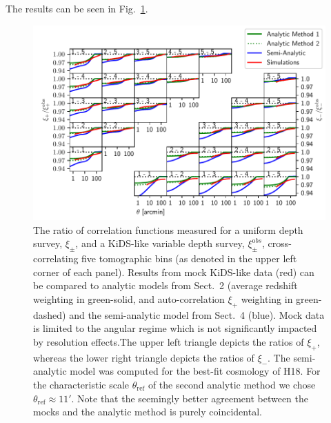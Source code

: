\documentclass{aa}
\renewcommand{\rm}{\mathrm}
\begin{document}
The results can be seen in Fig.~\ref{fig:all_xis}.
  \begin{figure}
  \centering
  \includegraphics[width=0.9\linewidth]{images/xis_all1.pdf}
  \caption{The ratio of correlation functions measured for a uniform depth survey, $\xi_\pm$, and a KiDS-like variable depth survey, $\xi_\pm^{\rm obs}$, cross-correlating five tomographic bins (as denoted in the upper left corner of each panel). Results from mock KiDS-like data (red) can be compared to analytic models from Sect.~2 (average redshift weighting in green-solid, and auto-correlation $\xi_+$ weighting in green-dashed) and the semi-analytic model from Sect.~4 (blue). Mock data is limited to the angular regime which is not significantly impacted by resolution effects.The upper left triangle depicts the ratios of $\xi_+$, whereas the lower right triangle depicts the ratios of $\xi_-$. The semi-analytic model was computed for the best-fit cosmology of H18. For the characteristic scale $\theta_{\rm{ref}}$ of the second analytic method we chose $\theta_{\rm{ref}} \approx 11'$. Note that the seemingly better agreement between the mocks and the analytic method is purely coincidental.}
  \label{fig:all_xis}
  \end{figure}
\end{document}
